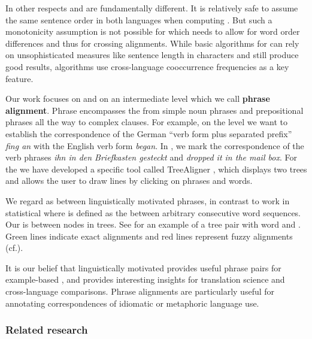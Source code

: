 \documentclass[output=paper]{LSP/langsci}
\begin{document}
In other respects  and  are fundamentally different. It is relatively safe to assume the same sentence order in both languages when computing . But such a monotonicity assumption is not possible for  which needs to allow for word order differences and thus for crossing alignments. While basic algorithms for  can rely on unsophisticated measures like sentence length in characters and still produce good results,  algorithms use cross-language cooccurrence frequencies as a key feature. 

Our work focuses on  and on an intermediate  level which we call \textbf{phrase} \textbf{alignment}. Phrase  encompasses the  from simple noun phrases and prepositional phrases all the way to complex clauses. For example, on the  level we want to establish the correspondence of the German ``verb form plus separated prefix'' \textit{fing an} with the English verb form \textit{began}. In , we mark the correspondence of the verb phrases \textit{ihn in den Briefkasten gesteckt }and \textit{dropped it in the mail box}. For the  we have developed a specific tool called TreeAligner \citep{LundborgEtAl2007}, which displays two trees and allows the user to draw  lines by clicking on phrases and words. 

We regard  as  between linguistically motivated phrases, in contrast to work in statistical  where  is defined as the  between arbitrary consecutive word sequences. Our  is  between nodes in  trees. See  for an example of a tree pair with word and . Green lines indicate exact alignments and red lines represent fuzzy alignments (cf.). 

 
{\sloppy
It is our belief that linguistically motivated  provides useful phrase pairs for example-based , and provides interesting insights for translation science and cross-language comparisons. Phrase alignments are particularly useful for annotating correspondences of idiomatic or metaphoric language use. 
}
\subsubsection{Related research}\label{sec:volk:2.2.1}
\end{document}
